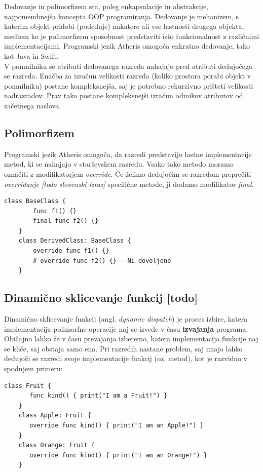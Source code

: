 \documentclass[a4paper, 12p]{book}
\begin{document}
Dedovanje in polimorfizem sta, poleg enkapsulacije in abstrakcije, najpomembnejša koncepta OOP programiranja. Dedovanje je mehanizem, s katerim objekt pridobi (podeduje) nakatere ali vse lastnosti drugega objekta, medtem ko je polimorfizem sposobnost predstaviti isto funkcionalnost z različnimi implementacijami. Programski jezik Atheris omogoča enkratno dedovanje, tako kot Java in Swift. \\
\indent V pomnilniku se atributi dedovanega razreda nahajajo pred atributi dedujočega se razreda. Enačba za izračun velikosti razreda (koliko prostora porabi objekt v pomnilniku) postane kompleksnejša, saj je potrebno rekurzivno prišteti velikosti nadrazradov. Prav tako postane kompleksnejši izračun odmikov atributov od začetnega naslova.

\subsection{Polimorfizem}

Programski jezik Atheris omogoča, da razredi predstavijo lastne implementacije metod, ki se nahajajo v starševskem razredu. Vsako tako metodo moramo označiti z modifikatorjem \textit{override}. Če želimo dedujočim se razredom preprečiti \textit{overridanje [todo slovenski izraz]} specifične metode, ji dodamo modifikator \textit{final}.

\begin{lstlisting}[caption={Polimorfizem.}, captionpos=b, label={virtualTableExamples}]
	class BaseClass {
	    func f1() {}
	    final func f2() {}
	}
	class DerivedClass: BaseClass {
	    override func f1() {}
	    # override func f2() {} - Ni dovoljeno
	}
\end{lstlisting}

\subsection{Dinamično sklicevanje funkcij [todo]} \label{dynamicDispatch}

Dinamično sklicevanje funkcij (angl. \textit{dynamic dispatch}) je proces izbire, katera implementacija polimorfne operacije naj se izvede v času \textbf{izvajanja} programa. Običajno lahko že v času prevajanja izberemo, katera implementacija funkcije naj se kliče, saj obstaja samo ena. Pri razredih nastane problem, saj imajo lahko dedujoči se razredi svoje implementacije funkcij (oz. metod), kot je razvidno v spodnjem primeru: 

\begin{lstlisting}[caption={Več implementacij za isto funkcionalnost.}, captionpos=b, label={virtualTableExamples}]
	class Fruit {
	   func kind() { print("I am a Fruit!") }
	}
	class Apple: Fruit {
	   override func kind() { print("I am an Apple!") }
	}
	class Orange: Fruit {
	   override func kind() { print("I am an Orange!") }
	}
\end{lstlisting}
\end{document}

